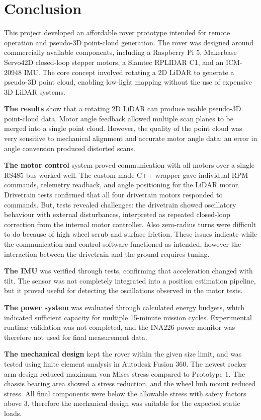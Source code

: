 \chapter{Conclusion}
This project developed an affordable rover prototype intended for remote operation and pseudo-3D point-cloud generation.
The rover was designed around commercially available components, including a Raspberry Pi 5, Makerbase Servo42D closed-loop stepper motors, 
a Slamtec RPLIDAR C1, and an ICM-20948 IMU.
The core concept involved rotating a 2D LiDAR to generate a pseudo-3D point cloud, enabling low-light mapping without the use of expensive 3D LiDAR systems.


\textbf{The results} show that a rotating 2D LiDAR can produce usable pseudo-3D point-cloud data. Motor angle feedback allowed multiple scan planes to be merged into a single point cloud. However, 
the quality of the point cloud was very sensitive to mechanical alignment and accurate motor angle data; an error in angle conversion produced distorted scans.

\textbf{The motor control} system proved communication with all motors over a single RS485 bus worked well.  
The custom made C++ wrapper gave individual RPM commands, telemetry readback, and angle positioning for the LiDAR motor. 
Drivetrain tests confirmed that all four drivetrain motors responded to commands. 
But, tests revealed challenges: the drivetrain showed oscillatory behaviour with external disturbances, interpreted as repeated closed-loop correction from the internal motor controller.
Also zero-radius turns were difficult to do because of high wheel scrub and surface friction. 
These issues indicate while the communication and control software functioned as intended, however the interaction between the drivetrain and the ground requires tuning.

\textbf{The IMU} was verified through tests, confirming that acceleration changed with tilt.
The sensor was not completely integrated into a position estimation pipeline, but it proved useful for detecting the oscillations observed in the motor tests.

\textbf{The power system} was evaluated through calculated energy budgets, which indicated sufficient capacity for multiple 15-minute mission cycles.
Experimental runtime validation was not completed, and the INA226 power monitor was therefore not used for final measurement data.

\textbf{The mechanical design} kept the rover within the given size limit, and was tested using finite element analysis in Autodesk Fusion 360. The newest rocker arm design reduced maximum von Mises stress compared to Prototype 1. The chassis bearing area showed a stress reduction, and the wheel hub mount reduced stress. All final components were below the allowable stress with safety factors above 3, therefore the mechanical design was suitable for the expected static loads. 

